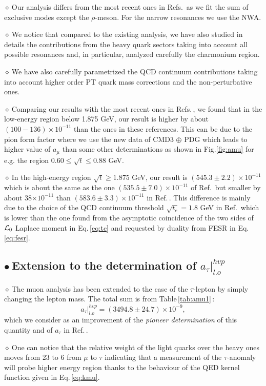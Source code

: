 \documentclass[review]{elsarticle}
\def\beq{\begin{equation}}
\def\eeq{\end{equation}}
\def\b{$\bullet~$}
\def\d{$\diamond~$}
\begin{document}
\d Our analysis differs from the most recent ones in Refs.\,\cite{NOMURA,DAVIER2} as we fit the sum of exclusive modes except the $\rho$-meson. For the narrow resonances we use the NWA.

\d We notice that compared to the existing analysis, we have also studied in details the contributions from the heavy quark sectors taking into account all possible resonances and, in particular, analyzed carefully the charmonium region. 

\d We have also carefully parametrized the QCD continuum contributions taking into account higher order PT quark mass corrections and the non-perturbative ones. 

\d Comparing our results with the most recent ones in Refs.\,\cite{DAVIER2,NOMURA}, we found that in the low-energy region below 1.875 GeV, our result is higher by about $(100-136)\times 10^{-11}$ than the ones in these references. This can be due to the pion form factor where we use the new data of CMD3 $\oplus$ PDG which leads to higher value of $a_\mu$ than some other determinations as shown in Fig.\ref{fig:amu} for e.g. the region $0.60\leq \sqrt{t}\leq 0.88$ GeV.

\d In the high-energy region $\sqrt{t}\geq 1.875$ GeV, our result is $(545.3\pm 2.2)\times 10^{-11}$ which is  about the same as  the one $(535.5\pm 7.0)\times 10^{-11}$ of Ref.\,\cite{NOMURA}  but smaller by about 38$\times 10^{-11}$ than $(583.6\pm 3.3)\times 10^{-11}$ in Ref.\,\cite{DAVIER2}. This difference is mainly due to  the choice of the QCD continuum threshold $\sqrt{t_c}= 1.8$ GeV in Ref.\,\cite{DAVIER2}  which is lower than the one found from the asymptotic coincidence of the two sides of ${\cal L}_0$ Laplace moment  in Eq.\,\ref{eq:tc} and requested by duality from FESR   in Eq. \ref{eq:fesr}. 

\subsection*{\b Extension to the determination of  $a_\tau\vert^{hvp}_{l.o}$} 
\d The muon analysis has been extended to the case of the $\tau$-lepton by simply changing the lepton mass. The total sum is from Table\,\ref{tab:amu1}\,:
\beq
a_\tau\vert^{hvp}_{l.o}=(3494.8\pm 24.7)\times 10^{-9},
\eeq
which we consider as an improvement of the {\it pioneer determination} of this quantity and of $a_\tau$ in Ref.\,\cite{SN78}. 

\d One can notice that the relative weight of the light quarks over the heavy ones moves from 23 to 6 from $\mu$ to $\tau$ indicating that a measurement of the $\tau$-anomaly will probe higher energy region thanks to the behaviour of the QED kernel function  given in Eq.\,\ref{eq:kmu}. 
\end{document}
